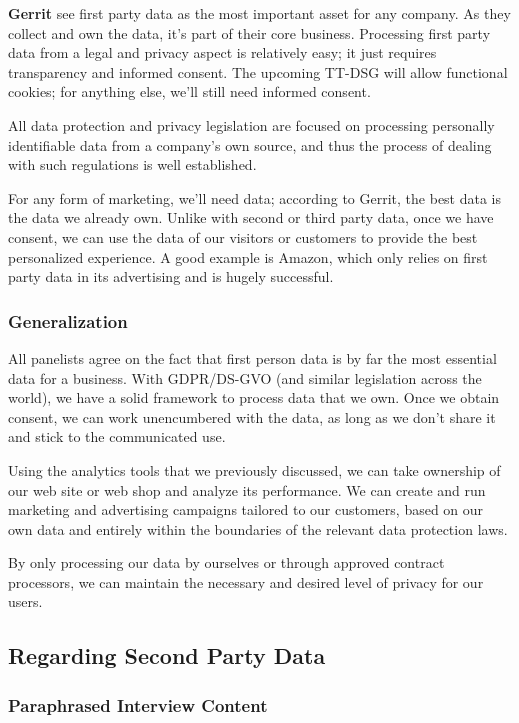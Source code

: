 \textbf{Gerrit} see first party data as the most important asset for any company. As they collect and own the data, it's part of their core business. Processing first party data from a legal and privacy aspect is relatively easy; it just requires transparency and informed consent. The upcoming TT-DSG will allow functional cookies; for anything else, we'll still need informed consent. 

All data protection and privacy legislation are focused on processing personally identifiable data from a company's own source, and thus the process of dealing with such regulations is well established.

For any form of marketing, we'll need data; according to Gerrit, the best data is the data we already own. Unlike with second or third party data, once we have consent, we can use the data of our visitors or customers to provide the best personalized experience. A good example is Amazon, which only relies on first party data in its advertising and is hugely successful.

\subsubsection{Generalization}

All panelists agree on the fact that first person data is by far the most essential data for a business. With GDPR/DS-GVO (and similar legislation across the world), we have a solid framework to process data that we own. Once we obtain consent, we can work unencumbered with the data, as long as we don't share it and stick to the communicated use.

Using the analytics tools that we previously discussed, we can take ownership of our web site or web shop and analyze its performance. We can create and run marketing and advertising campaigns tailored to our customers, based on our own data and entirely within the boundaries of the relevant data protection laws.

By only processing our data by ourselves or through approved contract processors, we can maintain the necessary and desired level of privacy for our users.

\subsection{Regarding Second Party Data}

\subsubsection{Paraphrased Interview Content}

